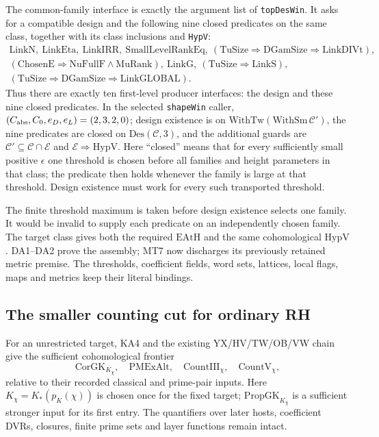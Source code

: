 The common-family interface is exactly the argument list of
\texttt{topDesWin}.  It asks for a compatible design and the following
nine closed predicates on the same class, together with its class
inclusions and \texttt{HypV}:
\[
\begin{gathered}
 \mathrm{LinkN},\ \mathrm{LinkEta},\ \mathrm{LinkIRR},\
 \mathrm{SmallLevelRankEq},\
 (\mathrm{TuSize}\Rightarrow\mathrm{DGamSize}\Rightarrow\mathrm{LinkDIVt}),\\
 (\mathrm{ChosenE}\Rightarrow\mathrm{NuFullF}\wedge\mathrm{MuRank}),\
 \mathrm{LinkG},\
 (\mathrm{TuSize}\Rightarrow\mathrm{LinkS}),\\
 (\mathrm{TuSize}\Rightarrow\mathrm{DGamSize}\Rightarrow\mathrm{LinkGLOBAL}).
\end{gathered}                                                    \tag{DA30.2}
\]
Thus there are exactly ten first-level producer interfaces: the design
and these nine closed predicates.  In the selected \texttt{shapeWin}
caller, $(C_{\rm abs},C_0,e_D,e_L)=(2,3,2,0)$; design existence is on
$\mathrm{WithTw}(\mathrm{WithSm}\,\mathcal C')$, the nine predicates
are closed on $\mathrm{Des}(\mathcal C,3)$, and the additional guards
are $\mathcal C'\subseteq\mathcal C\cap\mathcal E$ and
$\mathcal E\Rightarrow\mathrm{HypV}$.  Here ``closed'' means that for
every sufficiently small positive $\epsilon$ one threshold is chosen
before all families and height parameters in that class; the predicate
then holds whenever the family is large at that threshold.  Design
existence must work for every such transported threshold.

The finite threshold maximum is taken before design existence selects
one family.  It would be invalid to supply each predicate on an
independently chosen family.  The target class gives both the required
$\mathrm{EAtH}$ and the same cohomological $\mathrm{HypV}$.
DA1--DA2 prove the assembly; MT7 now discharges its previously retained
metric premise.  The thresholds, coefficient fields, word sets, lattices,
local flags, maps and metrics keep their literal bindings.

\subsection{The smaller counting cut for ordinary RH}

For an unrestricted target, KA4 and the existing YX/HV/TW/OB/VW chain
give the sufficient cohomological frontier
\[
 \mathrm{CorGK}_{K_\chi},\quad \mathrm{PMExAlt},\quad
 \mathrm{CountIII}_\chi,\quad \mathrm{CountV}_\chi,                \tag{DA30.3}
\]
relative to their recorded classical and prime-pair inputs.
Here $K_\chi=K_*(p_K(\chi))$ is chosen once for the fixed target;
$\mathrm{PropGK}_{K_\chi}$ is a sufficient stronger input for its
first entry.  The quantifiers over later hosts, coefficient DVRs,
closures, finite prime sets and layer functions remain intact.

